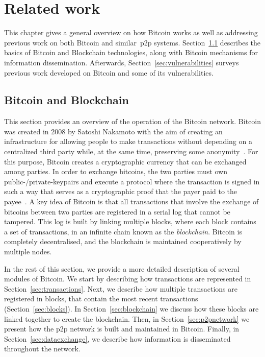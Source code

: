 \chapter{Related work}
\label{chap:rw}

This chapter gives a general overview on how Bitcoin works as well as addressing previous work on both Bitcoin and similar~\acrlong{p2p} systems. Section~\ref{sec:bb} describes the basics of Bitcoin and Blockchain technologies, along with Bitcoin mechanisms for information dissemination. Afterwards, Section~\ref{sec:vulnerabilities} surveys previous work developed on Bitcoin and some of its vulnerabilities.

\section{Bitcoin and Blockchain}
\label{sec:bb}
This section provides an overview of the operation of the Bitcoin network. Bitcoin was created in 2008 by Satoshi Nakamoto with the aim of creating an infrastructure for allowing people to make transactions without depending on a centralized third party while, at the same time, preserving some anonymity~\cite{nakamoto2008bitcoin}. For this purpose, Bitcoin creates a cryptographic currency that can be exchanged among parties. In order to exchange bitcoins, the two parties must own public-/private-keypairs and execute a protocol where the transaction is signed in such a way that serves as a cryptographic proof that the payer paid to the payee~\cite{decker2013information}. A key idea of Bitcoin is that all transactions that involve the exchange of bitcoins between two parties are registered in a serial log that cannot be tampered. This log is built by linking multiple blocks, where each block contains a set of transactions, in an infinite chain known as the \emph{blockchain}. Bitcoin is completely decentralised, and the blockchain is maintained cooperatively by multiple nodes.

In the rest of this section, we provide a more detailed description of several modules of Bitcoin. We start by describing how transactions are represented in Section~\ref{sec:transactions}. Next, we describe how multiple transactions are registered in blocks, that contain the most recent transactions (Section~\ref{sec:blocks}). In Section~\ref{sec:blockchain} we discuss how these blocks are linked together to create the blockchain. Then, in Section~\ref{sec:p2pnetwork} we present how the \acrlong{p2p} network is built and maintained in Bitcoin.
Finally, in Section~\ref{sec:dataexchange}, we describe how information is disseminated throughout the network.

